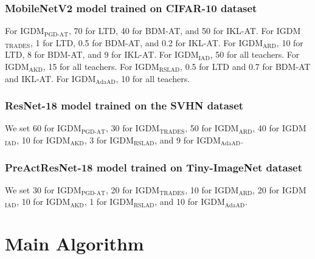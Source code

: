 \documentclass{article} %
\begin{document}
\subsubsection{MobileNetV2 model trained on CIFAR-10 dataset}
For IGDM$_{\text{PGD-AT}}$, 70 for LTD, 40 for BDM-AT, and 50 for IKL-AT.
For IGDM$_{\text{TRADES}}$, 1 for LTD, 0.5 for BDM-AT, and 0.2 for IKL-AT.
For IGDM$_{\text{ARD}}$, 10 for LTD, 8 for BDM-AT, and 9 for IKL-AT.
For IGDM$_{\text{IAD}}$, 50 for all teachers.
For IGDM$_{\text{AKD}}$, 15 for all teachers.
For IGDM$_{\text{RSLAD}}$, 0.5 for LTD and 0.7 for BDM-AT and IKL-AT.
For IGDM$_{\text{AdaAD}}$, 10 for all teachers.

\subsubsection{ResNet-18 model trained on the SVHN dataset}
We set 60 for IGDM$_{\text{PGD-AT}}$, 30 for IGDM$_{\text{TRADES}}$, 50 for IGDM$_{\text{ARD}}$, 40 for IGDM$_{\text{IAD}}$, 10 for IGDM$_{\text{AKD}}$, 3 for IGDM$_{\text{RSLAD}}$, and 9 for IGDM$_{\text{AdaAD}}$.

\subsubsection{PreActResNet-18 model trained on Tiny-ImageNet dataset}
We set 30 for IGDM$_{\text{PGD-AT}}$, 20 for IGDM$_{\text{TRADES}}$, 10 for IGDM$_{\text{ARD}}$, 20 for IGDM$_{\text{IAD}}$, 10 for IGDM$_{\text{AKD}}$, 1 for IGDM$_{\text{RSLAD}}$, and 10 for IGDM$_{\text{AdaAD}}$.



























\section{Main Algorithm}
\end{document}
